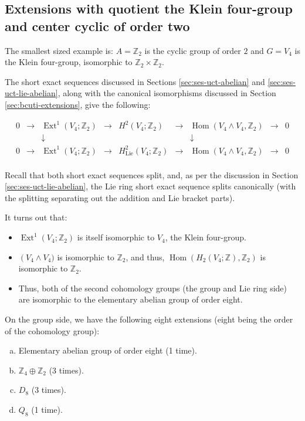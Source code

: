 \subsection{Extensions with quotient the Klein four-group and center cyclic of order two}

The smallest sized example is: $A = \mathbb{Z}_2$ is the cyclic group
of order $2$ and $G = V_4$ is the Klein four-group, isomorphic to
$\mathbb{Z}_2 \times \mathbb{Z}_2$.

The short exact sequences discussed in Sections
\ref{sec:ses-uct-abelian} and \ref{sec:ses-uct-lie-abelian}, along
with the canonical isomorphisms discussed in Section
\ref{sec:bcuti-extensions}, give the following:

$$\begin{array}{ccccccccc}
0 & \to & \operatorname{Ext}^1(V_4;\mathbb{Z}_2) & \to & H^2(V_4;\mathbb{Z}_2) & \to & \operatorname{Hom}(V_4 \wedge V_4,\mathbb{Z}_2) & \to & 0 \\
& & \downarrow & & & & \downarrow & & \\
0 & \to & \operatorname{Ext}^1(V_4;\mathbb{Z}_2) & \to & H^2_{\text{Lie}}(V_4;\mathbb{Z}_2) & \to & \operatorname{Hom}(V_4 \wedge V_4,\mathbb{Z}_2) & \to & 0\\
\end{array}$$

Recall that both short exact sequences split, and, as per the
discussion in Section \ref{sec:ses-uct-lie-abelian}, the Lie ring
short exact sequence splits canonically (with the splitting separating
out the addition and Lie bracket parts).

It turns out that:

\begin{itemize}
\item $\operatorname{Ext}^1(V_4;\mathbb{Z}_2)$ is itself isomorphic to $V_4$, the Klein four-group.
\item $\operatorname(V_4 \wedge V_4)$ is isomorphic to $\mathbb{Z}_2$,
  and thus, $\operatorname{Hom}(H_2(V_4;\mathbb{Z}),\mathbb{Z}_2)$ is
  isomorphic to $\mathbb{Z}_2$.
\item Thus, both of the second cohomology groups (the group and Lie
  ring side) are isomorphic to the elementary abelian group of order
  eight.
\end{itemize}

On the group side, we have the following eight extensions (eight being
the order of the cohomology group):

\begin{enumerate}[(a)]
\item Elementary abelian group of order eight (1 time).
\item $\mathbb{Z}_4 \oplus \mathbb{Z}_2$ (3 times).
\item $D_8$ (3 times).
\item $Q_8$ (1 time).
\end{enumerate}

